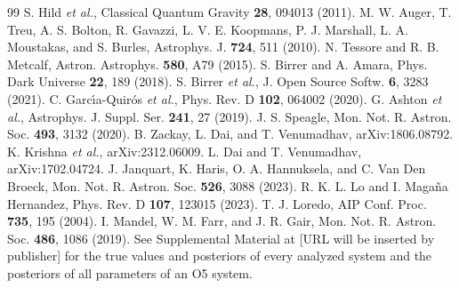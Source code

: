 \begin{thebibliography}{99}
S. Hild \textit{et al.}, Classical Quantum Gravity \textbf{28}, 094013 (2011).
M. W. Auger, T. Treu, A. S. Bolton, R. Gavazzi, L. V. E. Koopmans, P. J. Marshall, L. A. Moustakas, and S. Burles, Astrophys. J. \textbf{724}, 511 (2010).
N. Tessore and R. B. Metcalf, Astron. Astrophys. \textbf{580}, A79 (2015).
S. Birrer and A. Amara, Phys. Dark Universe \textbf{22}, 189 (2018).
S. Birrer \textit{et al.}, J. Open Source Softw. \textbf{6}, 3283 (2021).
C. Garc{\'\i}a-Quir{\'o}s \textit{et al.}, Phys. Rev. D \textbf{102}, 064002 (2020).
G. Ashton \textit{et al.}, Astrophys. J. Suppl. Ser. \textbf{241}, 27 (2019).
J. S. Speagle, Mon. Not. R. Astron. Soc. \textbf{493}, 3132 (2020).
B. Zackay, L. Dai, and T. Venumadhav, arXiv:1806.08792.
K. Krishna \textit{et al.}, arXiv:2312.06009.
L. Dai and T. Venumadhav, arXiv:1702.04724.
J. Janquart, K. Haris, O. A. Hannuksela, and C. Van Den Broeck, Mon. Not. R. Astron. Soc. \textbf{526}, 3088 (2023).
R. K. L. Lo and I. Maga{\~n}a Hernandez, Phys. Rev. D \textbf{107}, 123015 (2023).
T. J. Loredo, AIP Conf. Proc. \textbf{735}, 195 (2004).
I. Mandel, W. M. Farr, and J. R. Gair, Mon. Not. R. Astron. Soc. \textbf{486}, 1086 (2019).
See Supplemental Material at [URL will be inserted by publisher] for the true values and posteriors of every analyzed system and the posteriors of all parameters of an O5 system.
\end{thebibliography}
